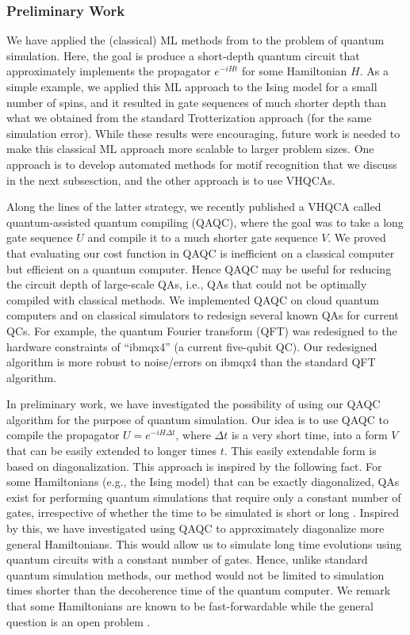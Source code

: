 \documentclass[11pt]{article}
\begin{document}
\subsubsection{Preliminary Work} We have applied the (classical) ML methods from \cite{Cincio2018} to the problem of quantum simulation. Here, the goal is produce a short-depth quantum circuit that approximately implements the propagator $e^{-iHt}$ for some Hamiltonian $H$. As a simple example, we applied this ML approach to the Ising model for a small number of spins, and it resulted in gate sequences of much shorter depth than what we obtained from the standard Trotterization approach (for the same simulation error). While these results were encouraging, future work is needed to make this classical ML approach more scalable to larger problem sizes. One approach is to develop automated methods for motif recognition that we discuss in the next subsesction, and the other approach is to use VHQCAs.


Along the lines of the latter strategy, we recently published \cite{Khatri2018} a VHQCA called quantum-assisted quantum compiling (QAQC), where the goal was to take a long gate sequence $U$ and compile it to a much shorter gate sequence $V$. We proved that evaluating our cost function in QAQC is inefficient on a classical computer but efficient on a quantum computer. Hence QAQC may be useful for reducing the circuit depth of large-scale QAs, i.e., QAs that could not be optimally compiled with classical methods. We implemented QAQC on cloud quantum computers and on classical simulators to redesign several known QAs for current QCs. For example, the quantum Fourier transform (QFT) was redesigned to the hardware constraints of ``ibmqx4'' (a current five-qubit QC). Our redesigned algorithm is more robust to noise/errors on ibmqx4 than the standard QFT algorithm.

In preliminary work, we have investigated the possibility of using our QAQC algorithm for the purpose of quantum simulation. Our idea is to use QAQC to compile the propagator $U = e^{-iH \Delta t}$, where $\Delta t$ is a very short time, into a form $V$ that can be easily extended to longer times $t$. This easily extendable form is based on diagonalization. This approach is inspired by the following fact. For some Hamiltonians (e.g., the Ising model) that can be exactly diagonalized, QAs exist for performing quantum simulations that require only a constant number of gates, irrespective of whether the time to be simulated is short or long \cite{6}. Inspired by this, we have investigated using QAQC to approximately diagonalize more general Hamiltonians. This would allow us to simulate long time evolutions using quantum circuits with a constant number of gates. Hence, unlike standard quantum simulation methods, our method would not be limited to simulation times shorter than the decoherence time of the quantum computer. We remark that some Hamiltonians are known to be fast-forwardable while the general question is an open problem \cite{14}. 
\end{document}
